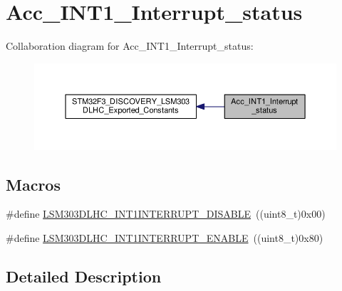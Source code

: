 \hypertarget{group__Acc__INT1__Interrupt__status}{\section{Acc\+\_\+\+I\+N\+T1\+\_\+\+Interrupt\+\_\+status}
\label{group__Acc__INT1__Interrupt__status}
}
Collaboration diagram for Acc\+\_\+\+I\+N\+T1\+\_\+\+Interrupt\+\_\+status\+:\nopagebreak
\begin{figure}[H]
\begin{center}
\leavevmode
\includegraphics[width=350pt]{group__Acc__INT1__Interrupt__status}
\end{center}
\end{figure}
\subsection*{Macros}
\begin{DoxyCompactItemize}
\item 
\#define \hyperlink{group__Acc__INT1__Interrupt__status_ga96e0d784ac920bd93783848d141180bf}{L\+S\+M303\+D\+L\+H\+C\+\_\+\+I\+N\+T1\+I\+N\+T\+E\+R\+R\+U\+P\+T\+\_\+\+D\+I\+S\+A\+B\+L\+E}~((uint8\+\_\+t)0x00)
\item 
\#define \hyperlink{group__Acc__INT1__Interrupt__status_gaf3b91304705c0a4eeaf3c244107a197d}{L\+S\+M303\+D\+L\+H\+C\+\_\+\+I\+N\+T1\+I\+N\+T\+E\+R\+R\+U\+P\+T\+\_\+\+E\+N\+A\+B\+L\+E}~((uint8\+\_\+t)0x80)
\end{DoxyCompactItemize}


\subsection{Detailed Description}


